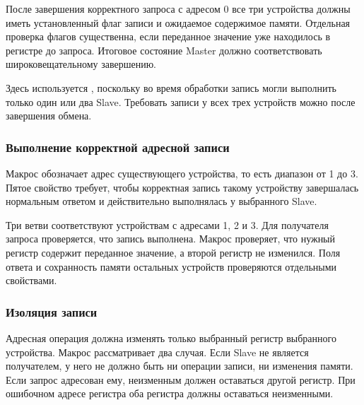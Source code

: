 
После завершения корректного запроса с адресом 0 все три устройства должны
иметь установленный флаг записи и ожидаемое содержимое памяти. Отдельная
проверка флагов существенна, если переданное значение уже находилось
в регистре до запроса. Итоговое состояние Master должно соответствовать
широковещательному завершению.

Здесь используется , поскольку во время обработки
запись могли выполнить только один или два Slave. Требовать записи
у всех трех устройств можно после завершения обмена.

\subsubsection{Выполнение корректной адресной записи}

Макрос  обозначает адрес существующего устройства,
то есть диапазон от 1 до 3. Пятое свойство требует, чтобы корректная запись
такому устройству завершалась нормальным ответом и действительно
выполнялась у выбранного Slave.


Три ветви соответствуют устройствам с адресами 1, 2 и 3. Для получателя
запроса проверяется, что запись выполнена. Макрос 
проверяет, что нужный регистр содержит переданное значение, а второй
регистр не изменился. Поля ответа и сохранность памяти остальных
устройств проверяются отдельными свойствами.

\subsubsection{Изоляция записи}

Адресная операция должна изменять только выбранный регистр выбранного
устройства. Макрос  рассматривает два случая.
Если Slave не является получателем, у него не должно быть ни операции
записи, ни изменения памяти. Если запрос адресован ему, неизменным должен
оставаться другой регистр. При ошибочном адресе регистра оба регистра
должны оставаться неизменными.



